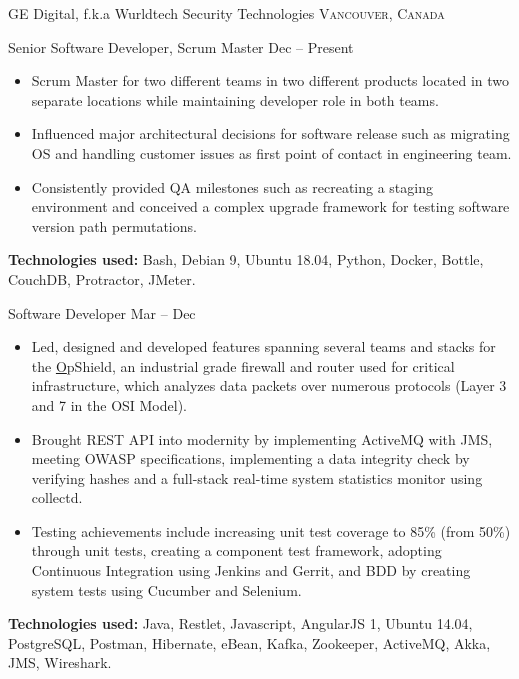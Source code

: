 \documentclass[10pt,a4paper]{article}
\begin{document}
\headedsection  %
  {{GE Digital, f.k.a Wurldtech Security Technologies}}
  {\textsc{Vancouver, Canada}} {%
  \headedsubsection
    {Senior Software Developer, Scrum Master}
    {Dec  -- Present}
   {\noindent
    
  \begin{itemize}  
\item Scrum Master for two different teams in two different products located in two separate locations while maintaining developer role in both teams.
\item Influenced major architectural decisions for software release such as migrating OS and handling customer issues as first point of contact in engineering team.
\item Consistently provided QA milestones such as recreating a staging environment and conceived a complex upgrade framework for testing software version path permutations. 
\end{itemize}
\textbf{Technologies used:} Bash, Debian 9, Ubuntu 18.04, Python, Docker, Bottle, CouchDB, Protractor, JMeter.}
    \vspace{.5em}
  \headedsubsection
    {Software Developer}
    {Mar  -- Dec }
    {\noindent\begin{itemize}  
\item Led, designed and developed features spanning several teams and stacks for the \href{https://www.ge.com/digital/asset/opshield-ge-digital}OpShield, an industrial
grade firewall and router used for critical infrastructure, which analyzes data packets over numerous protocols (Layer
3 and 7 in the OSI Model).
\item Brought REST API into modernity by implementing ActiveMQ
with JMS, meeting OWASP specifications, implementing a data integrity check by verifying hashes and a full-stack real-time system statistics monitor using collectd.
\item Testing achievements include increasing unit test coverage to 85\% (from 50\%) through unit tests, creating a component test framework, adopting Continuous Integration using Jenkins and Gerrit, and BDD by creating system tests using Cucumber and Selenium.
\end{itemize}
\textbf{Technologies used:} Java, Restlet, Javascript, AngularJS 1, Ubuntu 14.04, PostgreSQL, Postman, Hibernate, eBean, Kafka, Zookeeper, ActiveMQ, Akka, JMS, Wireshark.}
}
\end{document}
